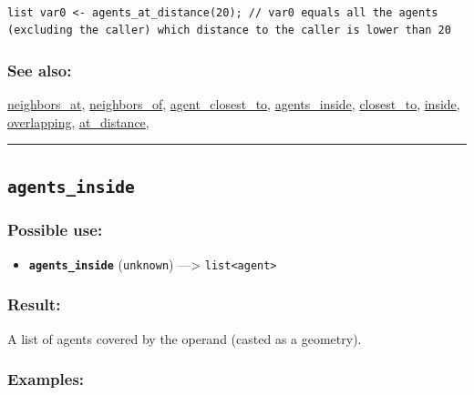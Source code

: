 \documentclass[]{book}
\providecommand{\tightlist}{%
  \setlength{\itemsep}{0pt}\setlength{\parskip}{0pt}}
\theoremstyle{definition}
\theoremstyle{definition}
\theoremstyle{definition}
\theoremstyle{remark}
\begin{document}
\begin{verbatim}
 
list var0 <- agents_at_distance(20); // var0 equals all the agents (excluding the caller) which distance to the caller is lower than 20
\end{verbatim}

\subsubsection{See also:}\label{see-also-21}

\href{operators-n-to-r.html\#neighbors_at}{neighbors\_at},
\href{operators-n-to-r.html\#neighbors_of}{neighbors\_of},
\href{operators-a-to-a.html\#agent_closest_to}{agent\_closest\_to},
\href{operators-a-to-a.html\#agents_inside}{agents\_inside},
\href{operators-b-to-c.html\#closest_to}{closest\_to},
\href{operators-i-to-m.html\#inside}{inside},
\href{operators-n-to-r.html\#overlapping}{overlapping},
\href{operators-a-to-a.html\#at_distance}{at\_distance},

\begin{center}\rule{0.5\linewidth}{\linethickness}\end{center}

\subsection{\texorpdfstring{\texttt{agents\_inside}}{agents\_inside}}\label{agents_inside}

\subsubsection{Possible use:}\label{possible-use-30}

\begin{itemize}
\tightlist
\item
  \textbf{\texttt{agents\_inside}} (\texttt{unknown}) ---\textgreater{}
  \texttt{list\textless{}agent\textgreater{}}
\end{itemize}

\subsubsection{Result:}\label{result-29}

A list of agents covered by the operand (casted as a geometry).

\subsubsection{Examples:}\label{examples-23}
\end{document}
